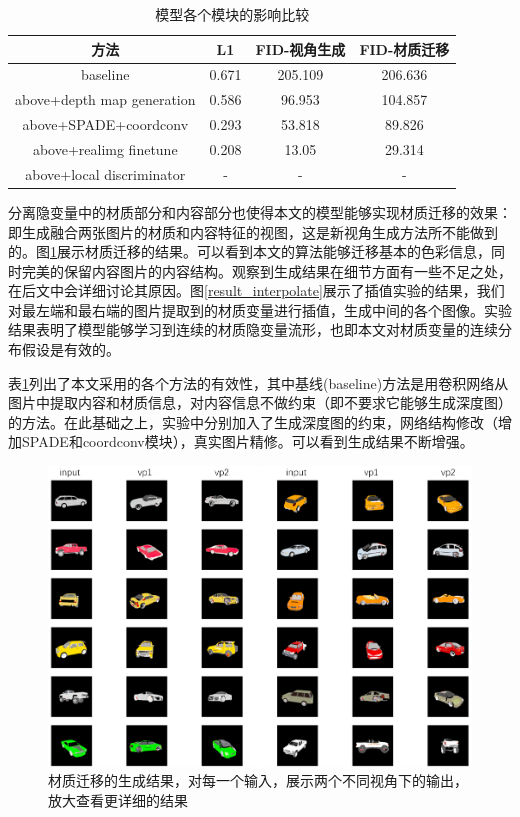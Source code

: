 \documentclass[UTF8,openany,AutoFakeBold,AutoFakeSlant,cs4size]{ctexbook}
\begin{document}
\begin{table}[h]
\small %
\centering
\caption{模型各个模块的影响比较}
\label{ablation_study}
\begin{tabular}{cccc} %
\toprule %
方法 & L1 & FID-视角生成 & FID-材质迁移 \\
\midrule
baseline & 0.671 & 205.109 & 206.636 \\
above+depth map generation & 0.586 & 96.953 & 104.857 \\
above+SPADE+coordconv & 0.293 & 53.818 & 89.826 \\
above+realimg finetune & 0.208 & 13.05 & 29.314 \\
above+local discriminator & - & - & - \\
\bottomrule
\end{tabular}
\end{table}

分离隐变量中的材质部分和内容部分也使得本文的模型能够实现材质迁移的效果：即生成融合两张图片的材质和内容特征的视图，这是新视角生成方法所不能做到的。图\ref{result_styletrans}展示材质迁移的结果。可以看到本文的算法能够迁移基本的色彩信息，同时完美的保留内容图片的内容结构。观察到生成结果在细节方面有一些不足之处，在后文中会详细讨论其原因。图\ref{result_interpolate}展示了插值实验的结果，我们对最左端和最右端的图片提取到的材质变量进行插值，生成中间的各个图像。实验结果表明了模型能够学习到连续的材质隐变量流形，也即本文对材质变量的连续分布假设是有效的。

表\ref{ablation_study}列出了本文采用的各个方法的有效性，其中基线(baseline)方法是用卷积网络从图片中提取内容和材质信息，对内容信息不做约束（即不要求它能够生成深度图）的方法。在此基础之上，实验中分别加入了生成深度图的约束，网络结构修改（增加SPADE和coordconv模块），真实图片精修。可以看到生成结果不断增强。

\begin{figure}
\centering
\includegraphics[width=\linewidth]{./images/style_transfer_thesis.png}
\caption{材质迁移的生成结果，对每一个输入，展示两个不同视角下的输出，放大查看更详细的结果}
\label{result_styletrans}
\end{figure}
\end{document}
